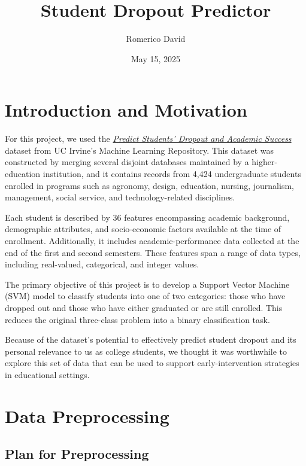 \documentclass[12pt]{article}
\title{Student Dropout Predictor}
\author{Romerico David}
\date{May 15, 2025}
\begin{document}
\maketitle

\tableofcontents
\newpage

\section{Introduction and Motivation}

For this project, we used the \href{https://archive.ics.uci.edu/dataset/697/predict+students+dropout+and+academic+success}{\textit{Predict Students’ Dropout and Academic Success}} dataset from UC Irvine's Machine Learning Repository. This dataset was constructed by merging several disjoint databases maintained by a higher-education institution, and it contains records from 4,424 undergraduate students enrolled in programs such as agronomy, design, education, nursing, journalism, management, social service, and technology-related disciplines.

Each student is described by 36 features encompassing academic background, demographic attributes, and socio-economic factors available at the time of enrollment. Additionally, it includes academic-performance data collected at the end of the first and second semesters. These features span a range of data types, including real-valued, categorical, and integer values.

The primary objective of this project is to develop a Support Vector Machine (SVM) model to classify students into one of two categories: those who have dropped out and those who have either graduated or are still enrolled. This reduces the original three-class problem into a binary classification task.

Because of the dataset’s potential to effectively predict student dropout and its personal relevance to us as college students, we thought it was worthwhile to explore this set of data that can be used to support early-intervention strategies in educational settings.


\section{Data Preprocessing}
\subsection{Plan for Preprocessing}
\end{document}
